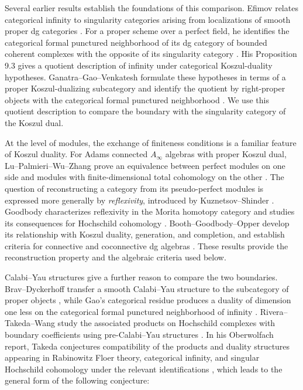 \documentclass[11pt,letterpaper,reqno]{amsart}
\theoremstyle{plain}
\theoremstyle{definition}
\theoremstyle{plain}
\theoremstyle{definition}
\numberwithin{equation}{section}
\begin{document}
Several earlier results establish the foundations of this comparison.
Efimov relates categorical infinity to singularity categories arising from localizations of smooth proper dg categories \cite[Theorem 3.2]{Efimov2017}.
For a proper scheme over a perfect field, he identifies the categorical formal punctured neighborhood of its dg category of bounded coherent complexes with the opposite of its singularity category \cite[Theorem 9.2]{Efimov2017}.
His Proposition 9.3 gives a quotient description of infinity under categorical Koszul-duality hypotheses.
Ganatra--Gao--Venkatesh formulate these hypotheses in terms of a proper Koszul-dualizing subcategory and identify the quotient by right-proper objects with the categorical formal punctured neighborhood \cite[Definition 2.12 and Proposition 2.13]{Ganatra-Gao-Venkatesh2022}.
We use this quotient description to compare the boundary with the singularity category of the Koszul dual.

At the level of modules, the exchange of finiteness conditions is a familiar feature of Koszul duality.
For Adams connected $A_\infty$ algebras with proper Koszul dual, Lu--Palmieri--Wu--Zhang prove an equivalence between perfect modules on one side and modules with finite-dimensional total cohomology on the other \cite[Theorem B and Corollary 7.2(b)]{Lu-Palmieri-Wu-Zhang2008}.
The question of reconstructing a category from its pseudo-perfect modules is expressed more generally by \emph{reflexivity}, introduced by Kuznetsov--Shinder \cite[Definition 3.11]{Kuznetsov-Shinder2025}.
Goodbody characterizes reflexivity in the Morita homotopy category and studies its consequences for Hochschild cohomology \cite[Theorems 4.4 and 5.1]{Goodbody2026}.
Booth--Goodbody--Opper develop its relationship with Koszul duality, generation, and completion, and establish criteria for connective and coconnective dg algebras \cite[Theorem 2.3.8 and Section 3]{Booth-Goodbody-Opper2025}.
These results provide the reconstruction property and the algebraic criteria used below.

Calabi--Yau structures give a further reason to compare the two boundaries.
Brav--Dyckerhoff transfer a smooth Calabi--Yau structure to the subcategory of proper objects \cite[Theorem 3.1]{Brav-Dyckerhoff2019}, while Gao's categorical residue produces a duality of dimension one less on the categorical formal punctured neighborhood of infinity \cite[Theorem 1.7]{Gao2025}.
Rivera--Takeda--Wang study the associated products on Hochschild complexes with boundary coefficients using pre-Calabi--Yau structures \cite{Rivera-Takeda-Wang2024}.
In his Oberwolfach report, Takeda conjectures compatibility of the products and duality structures appearing in Rabinowitz Floer theory, categorical infinity, and singular Hochschild cohomology under the relevant identifications \cite[p. 3165]{Takeda2023}, which leads to the general form of the following conjecture:
\end{document}
